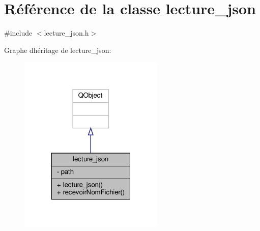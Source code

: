 \hypertarget{classlecture__json}{}\section{Référence de la classe lecture\+\_\+json}
\label{classlecture__json}


{\ttfamily \#include $<$lecture\+\_\+json.\+h$>$}



Graphe d\textquotesingle{}héritage de lecture\+\_\+json\+:\nopagebreak
\begin{figure}[H]
\begin{center}
\leavevmode
\includegraphics[width=196pt]{classlecture__json__inherit__graph}
\end{center}
\end{figure}


